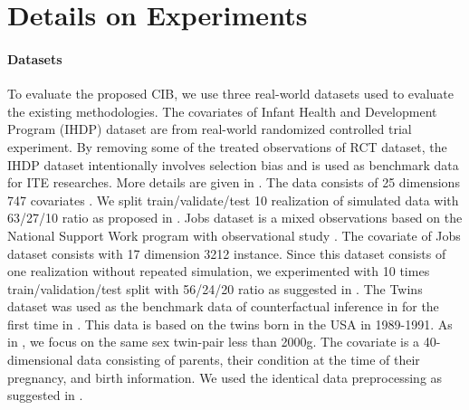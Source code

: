 \documentclass{article}
\begin{document}
\section{Details on Experiments}   
\paragraph{Datasets} 
    To evaluate the proposed CIB, we use three real-world datasets used to evaluate the existing methodologies\cite{johansson16, Shalit17, Louizos17}. The covariates of Infant Health and Development Program (IHDP) dataset are from real-world randomized controlled trial experiment. By removing some of the treated observations of RCT dataset, the IHDP dataset intentionally involves selection bias and is used as benchmark data for ITE researches. More details are given in \cite{hill2011bayesian}. The data consists of 25 dimensions 747 covariates . We split train/validate/test 10 realization of simulated data with 63/27/10 ratio as proposed in \cite{yao2018}. Jobs dataset \cite{LaLonde1986} is a mixed observations based on the National Support Work program with observational study \cite{Smith2005}. The covariate of Jobs dataset consists with 17 dimension 3212 instance. Since this dataset consists of one realization without repeated simulation, we experimented with 10 times train/validation/test split with 56/24/20 ratio as suggested in \cite{Shalit17}. The Twins dataset was used as the benchmark data of counterfactual inference in for the first time in \cite{Louizos17}. This data is based on the twins born in the USA in 1989-1991. As in \cite{yao2018}, we focus on the same sex twin-pair less than 2000g. The covariate is a 40-dimensional data consisting of parents, their condition at the time of their pregnancy, and birth information. We used the identical data preprocessing as suggested in \cite{yao2018}.
\end{document}
